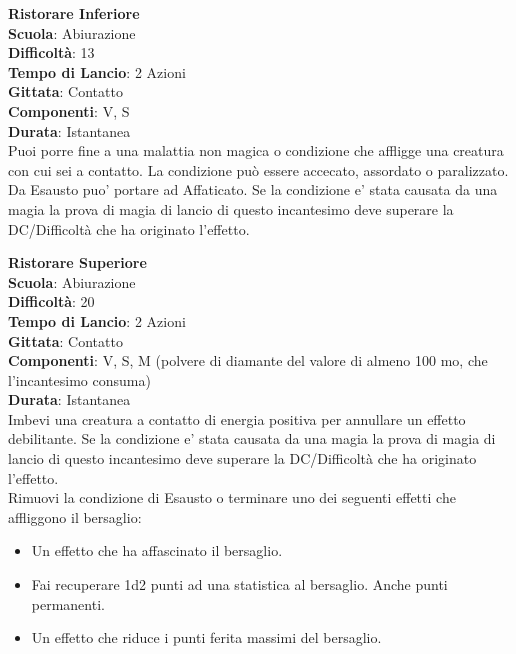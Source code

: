 \begin{multicols}{2}
\medskip\textbf{Ristorare Inferiore}\\
\textbf{Scuola}: Abiurazione\\
\textbf{Difficoltà}: 13\\
\textbf{Tempo di Lancio}: 2 Azioni\\
\textbf{Gittata}: Contatto\\
\textbf{Componenti}: V, S\\
\textbf{Durata}: Istantanea\\
Puoi porre fine a una malattia non magica o condizione che affligge una creatura con cui sei a contatto. La condizione può essere accecato, assordato o paralizzato. Da Esausto puo' portare ad Affaticato. Se la condizione e' stata causata da una magia la prova di magia di lancio di questo incantesimo deve superare la DC/Difficoltà che ha originato l'effetto.

\medskip\textbf{Ristorare Superiore}\\
\textbf{Scuola}: Abiurazione\\
\textbf{Difficoltà}: 20\\
\textbf{Tempo di Lancio}: 2 Azioni\\
\textbf{Gittata}: Contatto\\
\textbf{Componenti}: V, S, M (polvere di diamante del valore di almeno 100 mo, che l'incantesimo consuma)\\
\textbf{Durata}: Istantanea\\
Imbevi una creatura a contatto di energia positiva per annullare un effetto debilitante. 
Se la condizione e' stata causata da una magia la prova di magia di lancio di questo incantesimo deve superare la DC/Difficoltà che ha originato l'effetto.\\
Rimuovi la condizione di Esausto o terminare uno dei seguenti effetti che affliggono il bersaglio: 
\medskip
\begin{itemize}
\item
Un effetto che ha affascinato il bersaglio.
\item
Fai recuperare 1d2 punti ad una statistica al bersaglio. Anche punti permanenti.
\item
Un effetto che riduce i punti ferita massimi del bersaglio.
\end{itemize}


\end{multicols}
